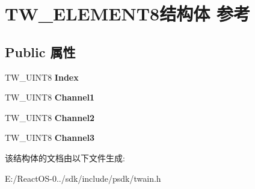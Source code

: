 \hypertarget{struct_t_w___e_l_e_m_e_n_t8}{}\section{T\+W\+\_\+\+E\+L\+E\+M\+E\+N\+T8结构体 参考}
\label{struct_t_w___e_l_e_m_e_n_t8}
\subsection*{Public 属性}
\begin{DoxyCompactItemize}
\item 
\mbox{\label{struct_t_w___e_l_e_m_e_n_t8_a1c0e979ce45d53243673f56d79a7fecf}} 
T\+W\+\_\+\+U\+I\+N\+T8 {\bfseries Index}
\item 
\mbox{\label{struct_t_w___e_l_e_m_e_n_t8_aea4615ec688c020d4a2771b2685da366}} 
T\+W\+\_\+\+U\+I\+N\+T8 {\bfseries Channel1}
\item 
\mbox{\label{struct_t_w___e_l_e_m_e_n_t8_a8998a8a890c232979a6fd2d1bf6fc5b0}} 
T\+W\+\_\+\+U\+I\+N\+T8 {\bfseries Channel2}
\item 
\mbox{\label{struct_t_w___e_l_e_m_e_n_t8_aafc764f13e0b78af93ae9c0b38a1d3eb}} 
T\+W\+\_\+\+U\+I\+N\+T8 {\bfseries Channel3}
\end{DoxyCompactItemize}


该结构体的文档由以下文件生成\+:\begin{DoxyCompactItemize}
\item 
E\+:/\+React\+O\+S-\/0../sdk/include/psdk/twain.\+h\end{DoxyCompactItemize}
